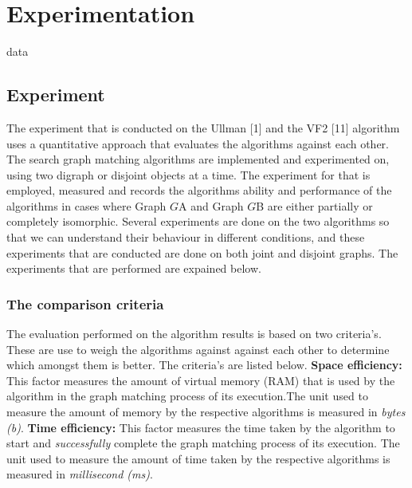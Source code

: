 \section{Experimentation}
\label{Experimentation}

{data}

\subsection{Experiment}
The experiment that is conducted on the Ullman [1] and the VF2 [11] algorithm uses a quantitative approach that evaluates the algorithms against each 
other. The search graph matching algorithms are implemented and experimented on, using two digraph or disjoint objects at a time. The experiment for that is 
employed, measured and records the algorithms ability and performance of the algorithms in cases where Graph $G${\tiny A} and Graph $G${\tiny B} are 
either partially or completely isomorphic.\newline\newline
Several experiments are done on the two algorithms so that we can understand their behaviour in different conditions, and these experiments that are conducted 
are done on both joint and disjoint graphs. The experiments that are performed are expained below.

\subsubsection{The comparison criteria}
\label{The comparison criteria}
The evaluation performed on the algorithm results is based on two criteria's. These are use to weigh the algorithms against against each other to determine which amongst them is better. The criteria's are listed below.\newline\newline
\textbf{Space efficiency:} This factor measures the amount of virtual memory (RAM) that is used by the algorithm in the graph matching process of its
execution.The unit used to measure the amount of memory  by the respective algorithms is measured in \textit{bytes (b)}. \newline\newline
\textbf{Time efficiency:} This factor measures the time taken by the algorithm to start and \textit{successfully} complete the graph matching process of its
execution. The unit used to measure the amount of time taken by the respective algorithms is measured in \textit{millisecond (ms)}. 

